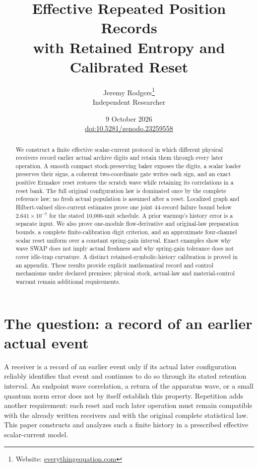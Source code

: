 \documentclass[11pt]{article}
\title{Effective Repeated Position Records\protect\\with Retained Entropy and Calibrated Reset}
\author{Jeremy Rodgers\thanks{Website: \href{https://everythingequation.com}{everythingequation.com}}\\Independent Researcher}
\date{9 October 2026\\[0.4em]
\normalsize\href{https://doi.org/10.5281/zenodo.23259558}{doi:10.5281/zenodo.23259558}}
\numberwithin{equation}{section}
\theoremstyle{definition}
\theoremstyle{remark}
\begin{document}
\maketitle
\begin{abstract}
We construct a finite effective scalar-current protocol in which different
physical receivers record earlier actual archive digits and retain them
through every later operation. A smooth compact stock-preserving baker
exposes the digits, a scalar loader preserves their signs, a coherent
two-coordinate gate writes each sign, and an exact positive Ermakov reset
restores the scratch wave while retaining its correlations in a reset bank.
The full original configuration law is dominated once by the complete
reference law; no fresh actual population is assumed after a reset.
Localized graph and Hilbert-valued slice-current estimates prove one joint
44-record failure bound below $2.641\times10^{-7}$ for the stated
10,000-unit schedule. A prior warmup's history error is a separate input.
We also prove one-module flow-derivative and original-law preparation
bounds, a complete finite-calibration digit criterion, and an approximate
four-channel scalar reset uniform over a constant spring-gain interval.
Exact examples show why wave SWAP does not imply actual freshness and why
spring-gain tolerance does not cover idle-trap curvature. A distinct
retained-symbolic-history calibration is proved in an appendix. These
results provide explicit mathematical record and control mechanisms under
declared premises; physical stock, actual-law and material-control warrant
remain additional requirements.
\end{abstract}
\clearpage
\tableofcontents
\newpage
\section{The question: a record of an earlier actual event}
\label{p2s:sec:introduction}

A receiver is a record of an earlier event only if its actual later
configuration reliably identifies that event and continues to do so
through its stated retention interval. An endpoint wave correlation,
a return of the apparatus wave, or a small quantum norm error does not
by itself establish this property. Repetition adds another requirement:
each reset and each later operation must remain compatible with the
already written receivers and with the original complete statistical law.
This paper constructs and analyzes such a finite history in a prescribed
effective scalar-current model.
\end{document}
